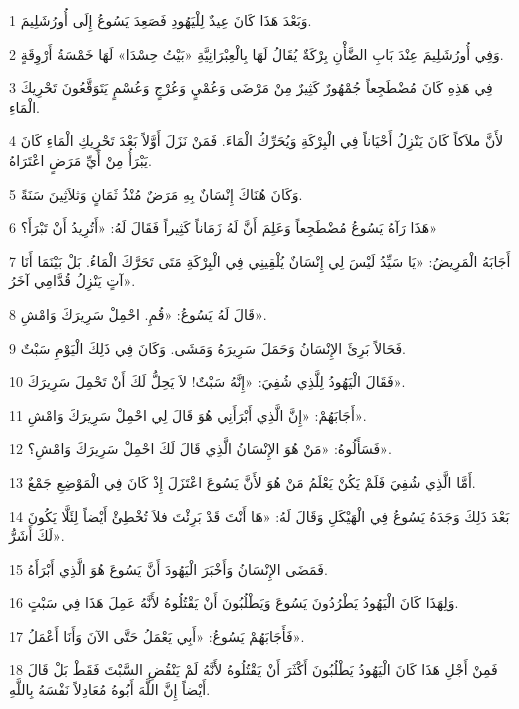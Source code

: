 \par 1 وَبَعْدَ هَذَا كَانَ عِيدٌ لِلْيَهُودِ فَصَعِدَ يَسُوعُ إِلَى أُورُشَلِيمَ.
\par 2 وَفِي أُورُشَلِيمَ عِنْدَ بَابِ الضَّأْنِ بِرْكَةٌ يُقَالُ لَهَا بِالْعِبْرَانِيَّةِ «بَيْتُ حِسْدَا» لَهَا خَمْسَةُ أَرْوِقَةٍ.
\par 3 فِي هَذِهِ كَانَ مُضْطَجِعاً جُمْهُورٌ كَثِيرٌ مِنْ مَرْضَى وَعُمْيٍ وَعُرْجٍ وَعُسْمٍ يَتَوَقَّعُونَ تَحْرِيكَ الْمَاءِ.
\par 4 لأَنَّ ملاَكاً كَانَ يَنْزِلُ أَحْيَاناً فِي الْبِرْكَةِ وَيُحَرِّكُ الْمَاءَ. فَمَنْ نَزَلَ أَوَّلاً بَعْدَ تَحْرِيكِ الْمَاءِ كَانَ يَبْرَأُ مِنْ أَيِّ مَرَضٍ اعْتَرَاهُ.
\par 5 وَكَانَ هُنَاكَ إِنْسَانٌ بِهِ مَرَضٌ مُنْذُ ثَمَانٍ وَثلاَثِينَ سَنَةً.
\par 6 هَذَا رَآهُ يَسُوعُ مُضْطَجِعاً وَعَلِمَ أَنَّ لَهُ زَمَاناً كَثِيراً فَقَالَ لَهُ: «أَتُرِيدُ أَنْ تَبْرَأَ؟»
\par 7 أَجَابَهُ الْمَرِيضُ: «يَا سَيِّدُ لَيْسَ لِي إِنْسَانٌ يُلْقِينِي فِي الْبِرْكَةِ مَتَى تَحَرَّكَ الْمَاءُ. بَلْ بَيْنَمَا أَنَا آتٍ يَنْزِلُ قُدَّامِي آخَرُ».
\par 8 قَالَ لَهُ يَسُوعُ: «قُمِ. احْمِلْ سَرِيرَكَ وَامْشِ».
\par 9 فَحَالاً بَرِئَ الإِنْسَانُ وَحَمَلَ سَرِيرَهُ وَمَشَى. وَكَانَ فِي ذَلِكَ الْيَوْمِ سَبْتٌ.
\par 10 فَقَالَ الْيَهُودُ لِلَّذِي شُفِيَ: «إِنَّهُ سَبْتٌ! لاَ يَحِلُّ لَكَ أَنْ تَحْمِلَ سَرِيرَكَ».
\par 11 أَجَابَهُمْ: «إِنَّ الَّذِي أَبْرَأَنِي هُوَ قَالَ لِي احْمِلْ سَرِيرَكَ وَامْشِ».
\par 12 فَسَأَلُوهُ: «مَنْ هُوَ الإِنْسَانُ الَّذِي قَالَ لَكَ احْمِلْ سَرِيرَكَ وَامْشِ؟».
\par 13 أَمَّا الَّذِي شُفِيَ فَلَمْ يَكُنْ يَعْلَمُ مَنْ هُوَ لأَنَّ يَسُوعَ اعْتَزَلَ إِذْ كَانَ فِي الْمَوْضِعِ جَمْعٌ.
\par 14 بَعْدَ ذَلِكَ وَجَدَهُ يَسُوعُ فِي الْهَيْكَلِ وَقَالَ لَهُ: «هَا أَنْتَ قَدْ بَرِئْتَ فلاَ تُخْطِئْ أَيْضاً لِئَلَّا يَكُونَ لَكَ أَشَرُّ».
\par 15 فَمَضَى الإِنْسَانُ وَأَخْبَرَ الْيَهُودَ أَنَّ يَسُوعَ هُوَ الَّذِي أَبْرَأَهُ.
\par 16 وَلِهَذَا كَانَ الْيَهُودُ يَطْرُدُونَ يَسُوعَ وَيَطْلُبُونَ أَنْ يَقْتُلُوهُ لأَنَّهُ عَمِلَ هَذَا فِي سَبْتٍ.
\par 17 فَأَجَابَهُمْ يَسُوعُ: «أَبِي يَعْمَلُ حَتَّى الآنَ وَأَنَا أَعْمَلُ».
\par 18 فَمِنْ أَجْلِ هَذَا كَانَ الْيَهُودُ يَطْلُبُونَ أَكْثَرَ أَنْ يَقْتُلُوهُ لأَنَّهُ لَمْ يَنْقُضِ السَّبْتَ فَقَطْ بَلْ قَالَ أَيْضاً إِنَّ اللَّهَ أَبُوهُ مُعَادِلاً نَفْسَهُ بِاللَّهِ.
